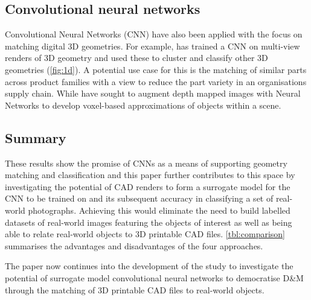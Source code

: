 \documentclass[a4paper, 11pt]{article}
\begin{document}
\subsection{Convolutional neural networks}

Convolutional Neural Networks (CNN) have also been applied with the focus on matching digital 3D geometries. For example, \textcite{zaki2016} has trained a CNN on multi-view renders of 3D geometry and used these to cluster and classify other 3D geometries (\cref{fig:1d}).
A potential use case for this is the matching of similar parts across product families with a view to reduce the part variety in an organisations supply chain. 
While \textcite{maturana2015} have sought to augment depth mapped images with Neural Networks to develop voxel-based approximations of objects within a scene.

\subsection{Summary}

These results show the promise of CNNs as a means of supporting geometry matching and classification and this paper further contributes to this space by investigating the potential of CAD renders to form a surrogate model for the CNN to be trained on and its subsequent accuracy in classifying a set of real-world photographs. Achieving this would eliminate the need to build labelled datasets of real-world images featuring the objects of interest as well as being able to relate real-world objects to 3D printable CAD files. \cref{tbl:comparison} summarises the advantages and disadvantages of the four approaches.

The paper now continues into the development of the study to investigate the potential of surrogate model convolutional neural networks to democratise D\&M through the matching of 3D printable CAD files to real-world objects.
\end{document}
